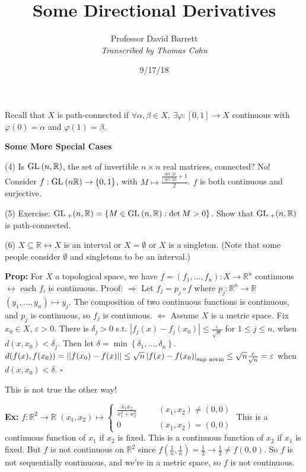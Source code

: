 \documentclass[10pt,letterpaper]{article}
\author{Professor David Barrett\\ \small\textit{Transcribed by Thomas Cohn}}
\title{Some Directional Derivatives}
\date{9/17/18} %
\newcommand{\n}{\hfill\break}
\newcommand{\prop}[1]{\par\noindent\settowidth{\hangindent}{\textbf{Prop: }}\textbf{Prop: }#1\n}
\newcommand{\ex}[1]{\par\noindent\settowidth{\hangindent}{\textbf{Ex: }}\textbf{Ex: }#1\n}
\newcommand{\proven}{\;$\square$\n}
\newcommand{\ptxt}[1]{\textrm{\textnormal{#1}}}
\newcommand{\set}[1]{\left\{#1\right\}}
\newcommand{\reals}{\mathbb{R}}
\newcommand{\R}{\reals}
\newcommand{\abs}[1]{\left|#1\right|}
\newcommand{\of}{\circ}
\newcommand{\norm}[1]{\abs{\abs{#1}}}
\newcommand{\GL}{\ptxt{GL}\>}
\newcommand{\st}{s.t.}
\begin{document}
\maketitle
\setlength\RaggedRightParindent{\parindent}
\RaggedRight

\par\noindent Recall that $X$ is path-connected if $\forall\alpha,\beta\in{}X$, $\exists\varphi:[0,1]\to{}X$ continuous with $\varphi(0)=\alpha$ and $\varphi(1)=\beta$.\n

\par\noindent\textbf{Some More Special Cases}
\par\noindent\settowidth{\hangindent}{(4) }(4) Is $\GL(n,\R)$, the set of invertible $n\times{}n$ real matrices, connected?\n
No! Consider $f:\GL(n\R)\to\set{0,1}$, with $\displaystyle{}M\mapsto\frac{\frac{\det{}M}{\abs{\det{}M}}+1}{2}$. $f$ is both continuous and surjective.\n

\par\noindent (5) Exercise: $\GL_{+}(n,\R)=\set{M\in\GL(n,\R):\det{}M>0}$. Show that $\GL_{+}(n,\R)$ is path-connected.\n

\par\noindent\settowidth{\hangindent}{(6) }(6) $X\subseteq\R\leftrightarrow{}X$ is an interval or $X=\emptyset$ or $X$ is a singleton. (Note that some people consider $\emptyset$ and singletons to be an interval.)\n

\prop{For $X$ a topological space, we have $f=(f_{1},\ldots,f_{n}):X\to\R^{n}$ continuous $\leftrightarrow$ each $f_{i}$ is continuous.\n
Proof: $\Rightarrow$ Let $f_{j}=p_{j}\of{}f$ where $p_{j}:\R^{n}\to\R$ $(y_{1},\ldots,y_{n})\mapsto{}y_{j}$. The composition of two continuous functions is continuous, and $p_{j}$ is continuous, so $f_{j}$ is continuous.\n
$\Leftarrow$ Assume $X$ is a metric space. Fix $x_{0}\in{}X$, $\varepsilon>0$. There is $\delta_{j}>0$ \st{} $\abs{f_{j}(x)-f_{j}(x_{0})}\le\frac{\varepsilon}{\sqrt{n}}$ for $1\le{}j\le{}n$, when $d(x,x_{0})<\delta_{j}$. Then let $\delta=\min\set{\delta_{1},\ldots,\delta_{n}}$.\n
$d(f(x),f(x_{0}))=\norm{f(x_{0})-f(x)}\le\sqrt{n}\abs{f(x)-f(x_{0})}_{\ptxt{sup norm}}\le\sqrt{n}\frac{\varepsilon}{\sqrt{n}}=\varepsilon$ when $d(x,x_{0})<\delta$.\n
\proven}

\par\noindent This is not true the other way!\n

\ex{$f:\R^{2}\to\R$\n
$(x_{1},x_{2})\mapsto\left\{\begin{array}{lll}\frac{x_{1}x_{2}}{x_{1}^{2}+x_{2}^{2}} & \quad & (x_{1},x_{2})\ne(0,0)\\ 0 & \quad & (x_{1},x_{2})=(0,0)\end{array}\right.$\n
This is a continuous function of $x_{1}$ if $x_{2}$ is fixed.\n
This is a continuous function of $x_{2}$ if $x_{1}$ is fixed.\n
But $f$ is not continuous on $\R^{2}$ since $f(\frac{1}{n},\frac{1}{n})=\frac{1}{2}\to\frac{1}{2}\ne{}f(0,0)$. So $f$ is not sequentially continuous, and we're in a metric space, so $f$ is not continuous.}
\end{document}
